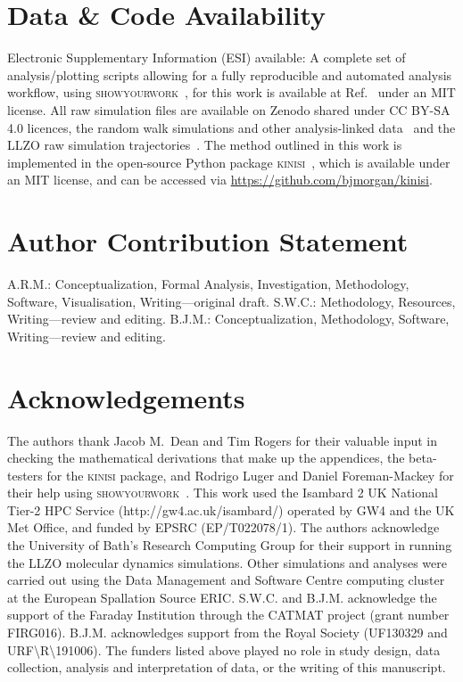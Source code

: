 \documentclass[reprint,superscriptaddress,nobibnotes,amsmath,amssymb,aps,prx,hidelinks,linenumbers]{revtex4-2}
\begin{document}
\section*{Data \& Code Availability}

Electronic Supplementary Information (ESI) available: A complete set of analysis/plotting scripts allowing for a fully reproducible and automated analysis workflow, using \textsc{showyourwork}~\cite{luger_showyourwork_2021}, for this work is available at Ref.~\cite{mccluskey_github_2022} under an MIT license.
All raw simulation files are available on Zenodo shared under CC BY-SA 4.0 licences, the random walk simulations and other analysis-linked data~\cite{mccluskey_zenodo_2022} and the LLZO raw simulation trajectories~\cite{coles_llzo_zenodo_2022}.
The method outlined in this work is implemented in the open-source Python package \textsc{kinisi}~\cite{mccluskey_kinisi_2022}, which is available under an MIT license, and can be accessed via \url{https://github.com/bjmorgan/kinisi}.

\section*{Author Contribution Statement}

A.R.M.: Conceptualization, Formal Analysis, Investigation, Methodology, Software, Visualisation, Writing---original draft.
S.W.C.: Methodology, Resources, Writing---review and editing.
B.J.M.: Conceptualization, Methodology, Software, Writing---review and editing.

\section*{Acknowledgements}

The authors thank Jacob M.\ Dean and Tim Rogers for their valuable input in checking the mathematical derivations that make up the appendices, the beta-testers for the \textsc{kinisi} package, and Rodrigo Luger and Daniel Foreman-Mackey for their help using \textsc{showyourwork}~\cite{luger_showyourwork_2021}.
This work used the Isambard 2 UK National Tier-2 HPC Service (http://gw4.ac.uk/isambard/) operated by GW4 and the UK Met Office, and funded by EPSRC (EP/T022078/1).
The authors acknowledge the University of Bath's Research Computing Group for their support in running the LLZO molecular dynamics simulations.
Other simulations and analyses were carried out using the Data Management and Software Centre computing cluster at the European Spallation Source ERIC.
S.W.C. and B.J.M. acknowledge the support of the Faraday Institution through the CATMAT project (grant number FIRG016). 
B.J.M. acknowledges support from the Royal Society (UF130329 and URF\textbackslash R\textbackslash 191006). 
The funders listed above played no role in study design, data collection, analysis and interpretation of data, or the writing of this manuscript.
\end{document}
